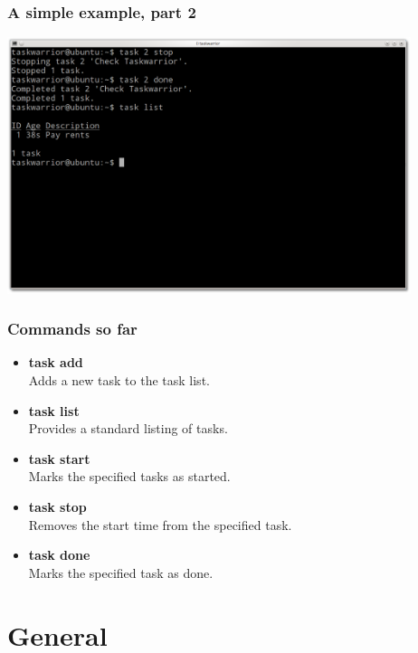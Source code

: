 \documentclass[t,handout]{beamer}
\begin{document}
\begin{frame}[fragile]\frametitle{A simple example, part 2}
\begin{center} %
\includegraphics[width=11.8cm,height=7.5cm]{simple-example2.png}
\end{center}
\end{frame}

\begin{frame}\frametitle{Commands so far}
\begin{itemize}
\item \textbf{task add} \\
Adds a new task to the task list. \pause
\item \textbf{task list} \\
Provides a standard listing of tasks. \pause
\item \textbf{task start} \\
Marks the specified tasks as started. \pause
\item \textbf{task stop} \\
Removes the start time from the specified task. \pause
\item \textbf{task done} \\
Marks the specified task as done.
\end{itemize}
\end{frame}

\section{General}
\end{document}
